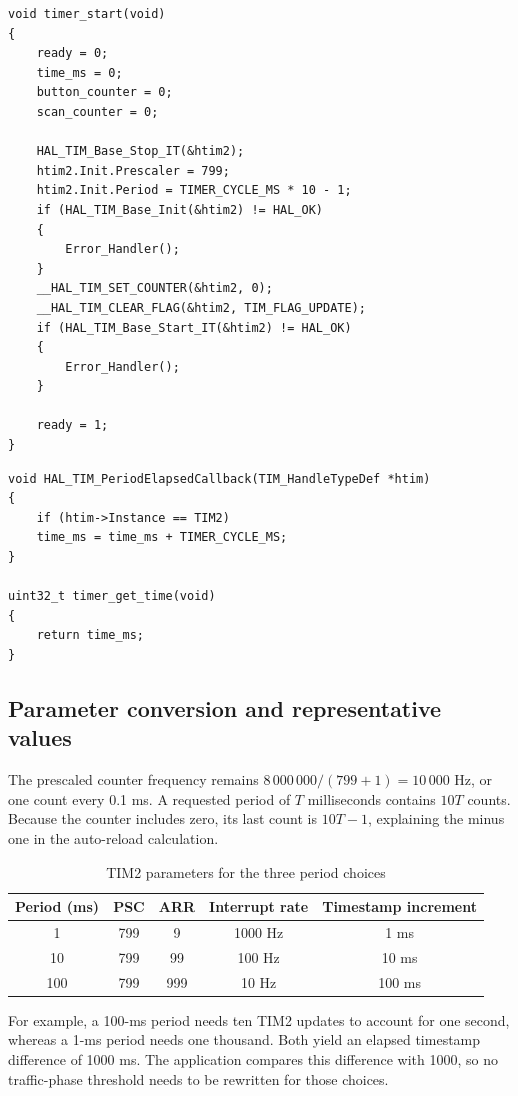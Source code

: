 \documentclass[a4paper]{article}
\newcommand{\topic}[1]{\subsection{#1}}
\begin{document}
\par\noindent\begin{minipage}{\linewidth}
\begin{lstlisting}[caption={Configurable TIM2 start sequence}]
void timer_start(void)
{
    ready = 0;
    time_ms = 0;
    button_counter = 0;
    scan_counter = 0;

    HAL_TIM_Base_Stop_IT(&htim2);
    htim2.Init.Prescaler = 799;
    htim2.Init.Period = TIMER_CYCLE_MS * 10 - 1;
    if (HAL_TIM_Base_Init(&htim2) != HAL_OK)
    {
        Error_Handler();
    }
    __HAL_TIM_SET_COUNTER(&htim2, 0);
    __HAL_TIM_CLEAR_FLAG(&htim2, TIM_FLAG_UPDATE);
    if (HAL_TIM_Base_Start_IT(&htim2) != HAL_OK)
    {
        Error_Handler();
    }

    ready = 1;
}
\end{lstlisting}
\end{minipage}\par

\par\noindent\begin{minipage}{\linewidth}
\begin{lstlisting}[caption={TIM2 elapsed-time service}]
void HAL_TIM_PeriodElapsedCallback(TIM_HandleTypeDef *htim)
{
    if (htim->Instance == TIM2)
    time_ms = time_ms + TIMER_CYCLE_MS;
}

uint32_t timer_get_time(void)
{
    return time_ms;
}
\end{lstlisting}
\end{minipage}\par

\topic{Parameter conversion and representative values}

The prescaled counter frequency remains
\(8\,000\,000/(799+1)=10\,000\) Hz, or one count every 0.1 ms.
A requested period of \(T\) milliseconds contains \(10T\) counts. Because
the counter includes zero, its last count is \(10T-1\), explaining the
minus one in the auto-reload calculation.
\begin{table}[htbp]\centering
\caption{TIM2 parameters for the three period choices}
\begin{tabular}{ccccc}\toprule
Period (ms) & PSC & ARR & Interrupt rate & Timestamp increment\\\midrule
1 & 799 & 9 & 1000 Hz & 1 ms\\
10 & 799 & 99 & 100 Hz & 10 ms\\
100 & 799 & 999 & 10 Hz & 100 ms\\\bottomrule
\end{tabular}\end{table}
For example, a 100-ms period needs ten TIM2 updates to account for one second,
whereas a 1-ms period needs one thousand. Both yield an elapsed timestamp
difference of 1000 ms. The application compares this difference with 1000,
so no traffic-phase threshold needs to be rewritten for those choices.
\end{document}

